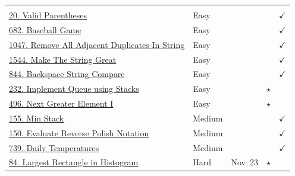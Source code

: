 \documentclass{article}
\begin{document}
\begin{longtable}{p{7.5cm} l l c c}
\rowcolor{gray!20} \multicolumn{5}{l}{\textbf{4. Stack}} \\
\href{https://leetcode.com/problems/valid-parentheses/}{20. Valid Parentheses} & Easy & & & $\checkmark$ \\
\href{https://leetcode.com/problems/baseball-game/}{682. Baseball Game} & Easy & & & $\checkmark$ \\
\href{https://leetcode.com/problems/remove-all-adjacent-duplicates-in-string/}{1047. Remove All Adjacent Duplicates In String} & Easy & & & $\checkmark$ \\
\href{https://leetcode.com/problems/make-the-string-great/}{1544. Make The String Great} & Easy & & & $\checkmark$ \\
\href{https://leetcode.com/problems/backspace-string-compare/}{844. Backspace String Compare} & Easy & & & $\checkmark$ \\
\href{https://leetcode.com/problems/implement-queue-using-stacks/}{232. Implement Queue using Stacks} & Easy & & $\star$ & \\
\href{https://leetcode.com/problems/next-greater-element-i/}{496. Next Greater Element I} & Easy & & $\star$ & \\
\href{https://leetcode.com/problems/min-stack/}{155. Min Stack} & Medium & & & $\checkmark$ \\
\href{https://leetcode.com/problems/evaluate-reverse-polish-notation/}{150. Evaluate Reverse Polish Notation} & Medium & & & $\checkmark$ \\
\href{https://leetcode.com/problems/daily-temperatures/}{739. Daily Temperatures} & Medium & & & $\checkmark$ \\
\href{https://leetcode.com/problems/largest-rectangle-in-histogram/}{84. Largest Rectangle in Histogram} & Hard & Nov~23 & $\star$ & \\


\end{longtable}
\end{document}

